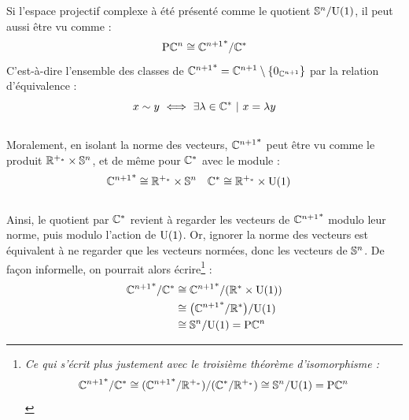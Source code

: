 Si l'espace projectif complexe à été présenté comme le quotient $\S{n}/\U{1}$, il peut aussi être vu comme :
\[\PC{n} \cong {\C^{n+1}}^*/\C^*\]
C'est-à-dire l'ensemble des classes de ${\C^{n+1}}^* = \C^{n+1} \setminus \{0_{\C^{n+1}}\}$ par la relation d'équivalence :
\[x \sim y\ \Llr\ \exists \lambda\in\C^*\ |\ x=\lambda y\]
\\
Moralement, en isolant la norme des vecteurs, ${\C^{n+1}}^*$ peut être vu comme le produit $\R^{+_*} \times \S{n}$, et de même pour $\C^*$ avec le module :
\begin{align*}
	{\C^{n+1}}^* &\cong \R^{+_*} \times \S{n}  &  \C^* &\cong \R^{+_*} \times \U{1}
\end{align*}
\\
Ainsi, le quotient par $\C^*$ revient à regarder les vecteurs de ${\C^{n+1}}^*$ modulo leur norme, puis modulo l'action de $\U{1}$. Or, ignorer la norme des vecteurs est équivalent à ne regarder que les vecteurs normées, donc les vecteurs de $\S{n}$. De façon informelle, on pourrait alors écrire\footnote{\itshape
	Ce qui s'écrit plus justement avec le troisième théorème d'isomorphisme : \[{\C^{n+1}}^*/\C^* \cong ({\C^{n+1}}^* / \R^{+_*})/(\C^* / \R^{+_*}) \cong \S{n}/\U{1} = \PC{n}\]
} :
\begin{align*}
	{\C^{n+1}}^*/\C^* &\cong {\C^{n+1}}^*/(\R^* \times \U{1})\\
	&\cong \big( {\C^{n+1}}^*/\R^* \big) /\U{1} \\
	&\cong \S{n}  / \U{1} = \PC{n} 
\end{align*}
\skipl

